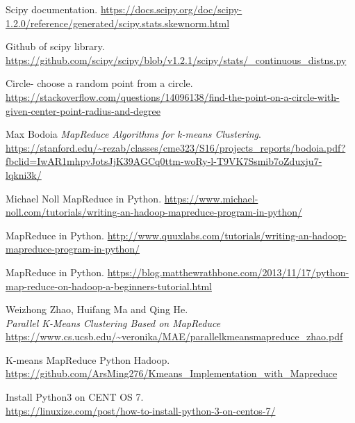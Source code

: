 \documentclass[
11pt, %
english,
singlespacing, %
headsepline, %
]{HadoopAssignment} %
\begin{document}
\renewcommand\bibname{References}
\begin{thebibliography}{9}
	
	Scipy documentation. 
	\url{https://docs.scipy.org/doc/scipy-1.2.0/reference/generated/scipy.stats.skewnorm.html}
	
	Github of scipy library.
	\url{https://github.com/scipy/scipy/blob/v1.2.1/scipy/stats/_continuous_distns.py}
	
	Circle- choose a random point from a circle.\\
	\url{https://stackoverflow.com/questions/14096138/find-the-point-on-a-circle-with-given-center-point-radius-and-degree}
	
	Max Bodoia
	\textit{MapReduce Algorithms for k-means Clustering}. 
	\url {https://stanford.edu/~rezab/classes/cme323/S16/projects_reports/bodoia.pdf?fbclid=IwAR1mhpyJotsJjK39AGCq0ttm-woRy-l-T9VK7Ssmib7oZduxju7-lqkni3k/}
	
	Michael Noll
	MapReduce in Python. 
	\url{https://www.michael-noll.com/tutorials/writing-an-hadoop-mapreduce-program-in-python/}
	
	MapReduce in Python.
	\url{http://www.quuxlabs.com/tutorials/writing-an-hadoop-mapreduce-program-in-python/}
	
	MapReduce in Python.
	\url{https://blog.matthewrathbone.com/2013/11/17/python-map-reduce-on-hadoop-a-beginners-tutorial.html}
	
	Weizhong Zhao, Huifang Ma and Qing He.\\
	\textit{Parallel K-Means Clustering Based on MapReduce}
	\url{https://www.cs.ucsb.edu/~veronika/MAE/parallelkmeansmapreduce_zhao.pdf}
	
	K-means MapReduce Python Hadoop.
	\url{https://github.com/ArsMing276/Kmeans_Implementation_with_Mapreduce}
	
	Install Python3 on CENT OS 7.\\
	\url{https://linuxize.com/post/how-to-install-python-3-on-centos-7/}
	
 
	
\end{thebibliography}
\end{document}
